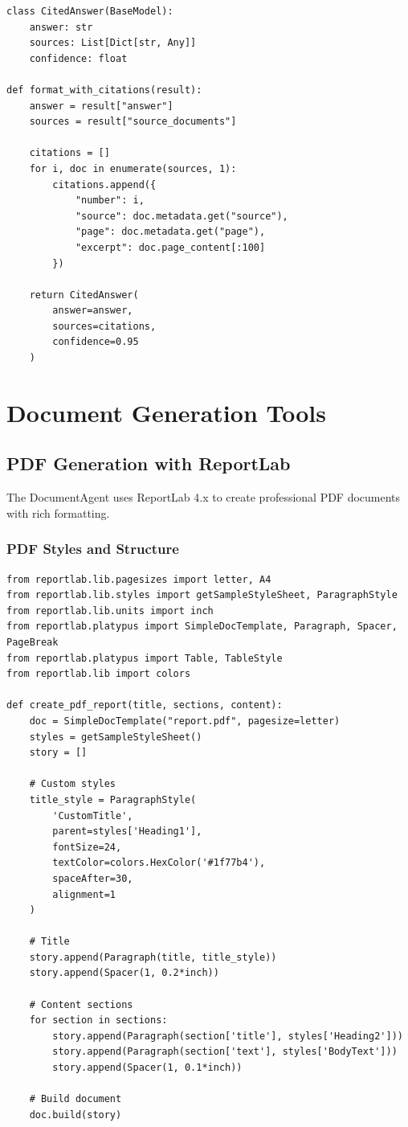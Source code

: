 \documentclass{report}
\begin{document}
\begin{lstlisting}
class CitedAnswer(BaseModel):
    answer: str
    sources: List[Dict[str, Any]]
    confidence: float

def format_with_citations(result):
    answer = result["answer"]
    sources = result["source_documents"]
    
    citations = []
    for i, doc in enumerate(sources, 1):
        citations.append({
            "number": i,
            "source": doc.metadata.get("source"),
            "page": doc.metadata.get("page"),
            "excerpt": doc.page_content[:100]
        })
    
    return CitedAnswer(
        answer=answer,
        sources=citations,
        confidence=0.95
    )
\end{lstlisting}

\chapter{Document Generation Tools}

\section{PDF Generation with ReportLab}

The DocumentAgent uses ReportLab 4.x to create professional PDF documents with rich formatting.

\subsection{PDF Styles and Structure}

\begin{lstlisting}
from reportlab.lib.pagesizes import letter, A4
from reportlab.lib.styles import getSampleStyleSheet, ParagraphStyle
from reportlab.lib.units import inch
from reportlab.platypus import SimpleDocTemplate, Paragraph, Spacer, PageBreak
from reportlab.platypus import Table, TableStyle
from reportlab.lib import colors

def create_pdf_report(title, sections, content):
    doc = SimpleDocTemplate("report.pdf", pagesize=letter)
    styles = getSampleStyleSheet()
    story = []
    
    # Custom styles
    title_style = ParagraphStyle(
        'CustomTitle',
        parent=styles['Heading1'],
        fontSize=24,
        textColor=colors.HexColor('#1f77b4'),
        spaceAfter=30,
        alignment=1
    )
    
    # Title
    story.append(Paragraph(title, title_style))
    story.append(Spacer(1, 0.2*inch))
    
    # Content sections
    for section in sections:
        story.append(Paragraph(section['title'], styles['Heading2']))
        story.append(Paragraph(section['text'], styles['BodyText']))
        story.append(Spacer(1, 0.1*inch))
    
    # Build document
    doc.build(story)
\end{lstlisting}
\end{document}
